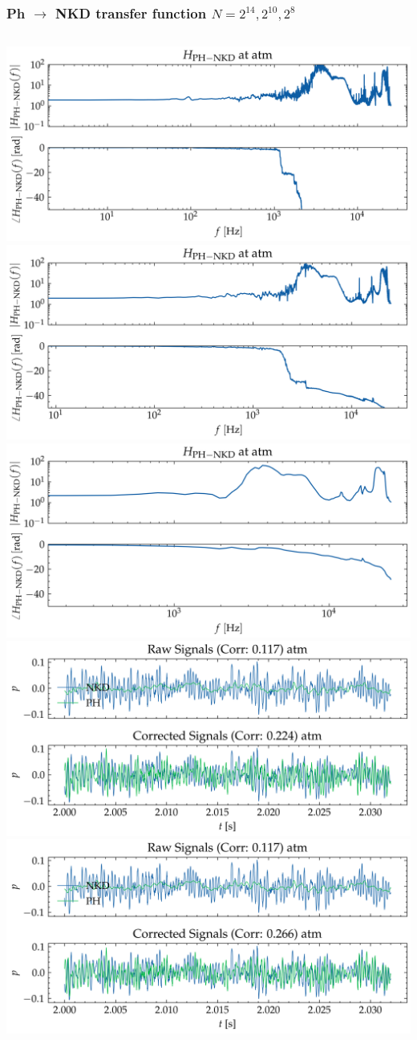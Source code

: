 \documentclass[aspectratio=169,10pt]{beamer}
\begin{document}
\begin{frame}
    \frametitle{Ph $\to$ NKD transfer function $N=2^{14}, 2^{10}, 2^{8}$}
    \begin{columns}[c] %
            \centering
            \includegraphics[width=0.6\linewidth]{../figures/cali_09/PH-NKD/H_atm_npsg16384.png}
            \includegraphics[width=0.6\linewidth]{../figures/cali_09/PH-NKD/H_atm_npsg4096.png}
            \includegraphics[width=0.6\linewidth]{../figures/cali_09/PH-NKD/H_atm_npsg256.png}
            \centering
            \includegraphics[width=0.6\linewidth]{../figures/cali_09/PH-NKD/ph_recon_atm_npsg16384.png}
            \includegraphics[width=0.6\linewidth]{../figures/cali_09/PH-NKD/ph_recon_atm_npsg4096.png}

\end{columns}
\end{frame}
\end{document}
